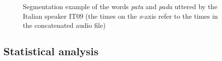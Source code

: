 \documentclass[charis]{glossa}
\begin{document}
\begin{figure}
  \centering
  \caption{Segmentation example of the words \textit{pata} and \textit{pada} uttered by the Italian speaker IT09 (the times on the \textit{x}-axis refer to the times in the concatenated audio file)}
  \label{f:segmentation}
\end{figure}

\hypertarget{statistical-analysis}{%
\subsection{Statistical analysis}\label{statistical-analysis}}
\end{document}

